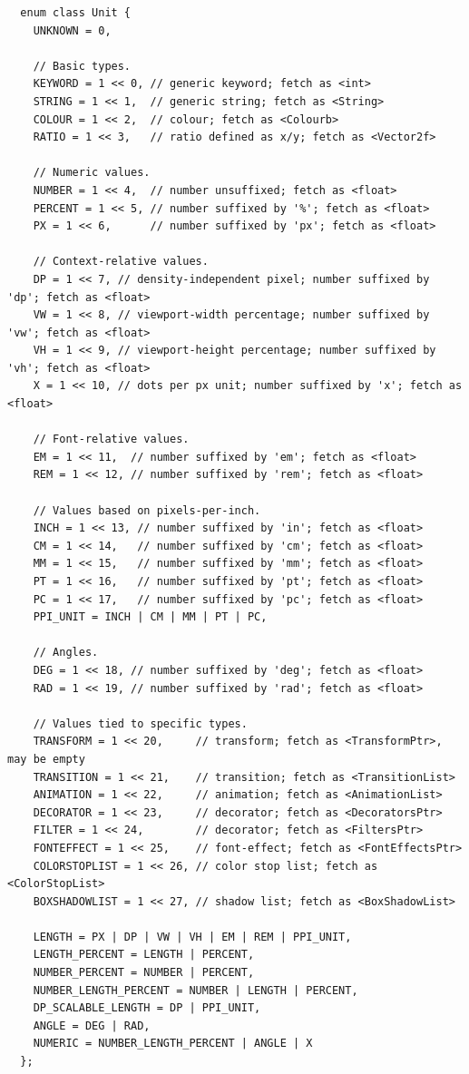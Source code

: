 \documentclass{article}
\begin{document}
  \begin{verbatim}
  enum class Unit {
    UNKNOWN = 0,

    // Basic types.
    KEYWORD = 1 << 0, // generic keyword; fetch as <int>
    STRING = 1 << 1,  // generic string; fetch as <String>
    COLOUR = 1 << 2,  // colour; fetch as <Colourb>
    RATIO = 1 << 3,   // ratio defined as x/y; fetch as <Vector2f>

    // Numeric values.
    NUMBER = 1 << 4,  // number unsuffixed; fetch as <float>
    PERCENT = 1 << 5, // number suffixed by '%'; fetch as <float>
    PX = 1 << 6,      // number suffixed by 'px'; fetch as <float>

    // Context-relative values.
    DP = 1 << 7, // density-independent pixel; number suffixed by 'dp'; fetch as <float>
    VW = 1 << 8, // viewport-width percentage; number suffixed by 'vw'; fetch as <float>
    VH = 1 << 9, // viewport-height percentage; number suffixed by 'vh'; fetch as <float>
    X = 1 << 10, // dots per px unit; number suffixed by 'x'; fetch as <float>

    // Font-relative values.
    EM = 1 << 11,  // number suffixed by 'em'; fetch as <float>
    REM = 1 << 12, // number suffixed by 'rem'; fetch as <float>

    // Values based on pixels-per-inch.
    INCH = 1 << 13, // number suffixed by 'in'; fetch as <float>
    CM = 1 << 14,   // number suffixed by 'cm'; fetch as <float>
    MM = 1 << 15,   // number suffixed by 'mm'; fetch as <float>
    PT = 1 << 16,   // number suffixed by 'pt'; fetch as <float>
    PC = 1 << 17,   // number suffixed by 'pc'; fetch as <float>
    PPI_UNIT = INCH | CM | MM | PT | PC,

    // Angles.
    DEG = 1 << 18, // number suffixed by 'deg'; fetch as <float>
    RAD = 1 << 19, // number suffixed by 'rad'; fetch as <float>

    // Values tied to specific types.
    TRANSFORM = 1 << 20,     // transform; fetch as <TransformPtr>, may be empty
    TRANSITION = 1 << 21,    // transition; fetch as <TransitionList>
    ANIMATION = 1 << 22,     // animation; fetch as <AnimationList>
    DECORATOR = 1 << 23,     // decorator; fetch as <DecoratorsPtr>
    FILTER = 1 << 24,        // decorator; fetch as <FiltersPtr>
    FONTEFFECT = 1 << 25,    // font-effect; fetch as <FontEffectsPtr>
    COLORSTOPLIST = 1 << 26, // color stop list; fetch as <ColorStopList>
    BOXSHADOWLIST = 1 << 27, // shadow list; fetch as <BoxShadowList>

    LENGTH = PX | DP | VW | VH | EM | REM | PPI_UNIT,
    LENGTH_PERCENT = LENGTH | PERCENT,
    NUMBER_PERCENT = NUMBER | PERCENT,
    NUMBER_LENGTH_PERCENT = NUMBER | LENGTH | PERCENT,
    DP_SCALABLE_LENGTH = DP | PPI_UNIT,
    ANGLE = DEG | RAD,
    NUMERIC = NUMBER_LENGTH_PERCENT | ANGLE | X
  };


\end{verbatim}
\end{document}
